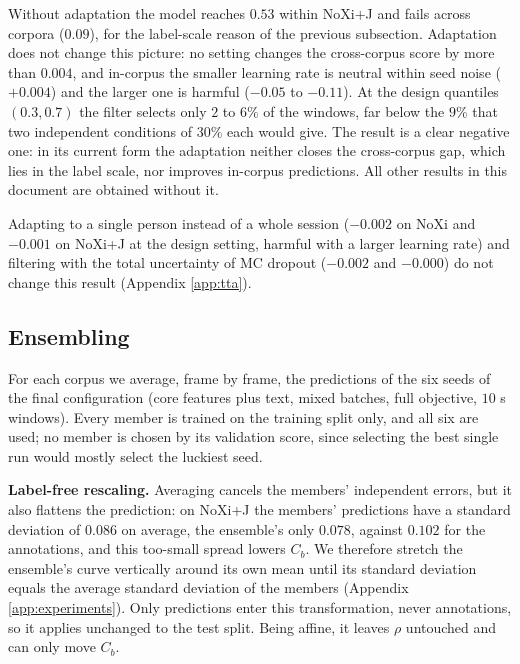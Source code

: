 \documentclass[10pt,a4paper,twocolumn]{article}
\begin{document}
	Without adaptation the model reaches $0.53$ within NoXi+J and fails across corpora ($0.09$), for the label-scale reason of the previous subsection. Adaptation does not change this picture: no setting changes the cross-corpus score by more than $0.004$, and in-corpus the smaller learning rate is neutral within seed noise ($+0.004$) and the larger one is harmful ($-0.05$ to $-0.11$). At the design quantiles $(0.3, 0.7)$ the filter selects only $2$ to $6\%$ of the windows, far below the $9\%$ that two independent conditions of $30\%$ each would give. The result is a clear negative one: in its current form the adaptation neither closes the cross-corpus gap, which lies in the label scale, nor improves in-corpus predictions. All other results in this document are obtained without it.

	Adapting to a single person instead of a whole session ($-0.002$ on NoXi and $-0.001$ on NoXi+J at the design setting, harmful with a larger learning rate) and filtering with the total uncertainty of MC dropout ($-0.002$ and $-0.000$) do not change this result (Appendix \ref{app:tta}).

	\subsection{Ensembling}
	For each corpus we average, frame by frame, the predictions of the six seeds of the final configuration (core features plus text, mixed batches, full objective, $10$ s windows). Every member is trained on the training split only, and all six are used; no member is chosen by its validation score, since selecting the best single run would mostly select the luckiest seed.

	\textbf{Label-free rescaling.} Averaging cancels the members' independent errors, but it also flattens the prediction: on NoXi+J the members' predictions have a standard deviation of $0.086$ on average, the ensemble's only $0.078$, against $0.102$ for the annotations, and this too-small spread lowers $C_b$. We therefore stretch the ensemble's curve vertically around its own mean until its standard deviation equals the average standard deviation of the members (Appendix \ref{app:experiments}). Only predictions enter this transformation, never annotations, so it applies unchanged to the test split. Being affine, it leaves $\rho$ untouched and can only move $C_b$.
\end{document}

